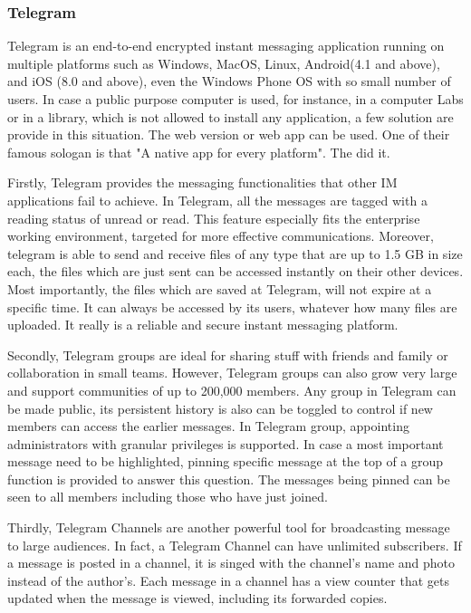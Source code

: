 \subsubsection{Telegram}

Telegram is an end-to-end encrypted instant messaging application running on multiple platforms such as Windows, MacOS, Linux, Android(4.1 and above), and iOS (8.0 and above), even the Windows Phone OS with so small number of users. In case a public purpose computer is used, for instance, in a computer Labs or in a library, which is not allowed to install any application, a few solution are provide in this situation. The web version or web app can be used. One of their famous sologan is that "A native app for every platform". The did it.

Firstly, Telegram provides the messaging functionalities that other IM applications fail to achieve. In Telegram, all the messages are tagged with a reading status of unread or read. This feature especially fits the enterprise working environment, targeted for more effective communications. Moreover, telegram is able to send and receive files of any type that are up to 1.5 GB in size each, the files which are just sent can be accessed instantly on their other devices. Most importantly, the files which are saved at Telegram, will not expire at a specific time. It can always be accessed by its users, whatever how many files are uploaded. It really is a reliable and secure instant messaging platform.

Secondly, Telegram groups are ideal for sharing stuff with friends and family or collaboration in small teams. However, Telegram groups can also grow very large and support communities of up to 200,000 members. Any group in Telegram can be made public, its persistent history is also can be toggled to control if new members can access the earlier messages. In Telegram group, appointing administrators with granular privileges is supported. In case a most important message need to be highlighted, pinning specific message at the top of a group function is provided to answer this question. The messages being pinned can be seen to all members including those who have just joined.

Thirdly, Telegram Channels are another powerful tool for broadcasting message to large audiences. In fact, a Telegram Channel can have unlimited subscribers. If a message is posted in a channel, it is singed with the channel's name and photo instead of the author's. Each message in a channel has a view counter that gets updated when the message is viewed, including its forwarded copies.

